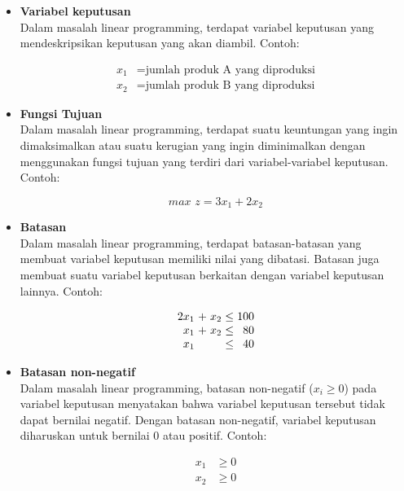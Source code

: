 \begin{itemize}
	\item \textbf{Variabel keputusan}\\
		Dalam masalah linear programming, terdapat variabel keputusan yang mendeskripsikan keputusan yang akan diambil. Contoh:
		
		\begin{equation*}
			\begin{split}
				x_1 &= \text{jumlah produk A yang diproduksi} \\
    			x_2 &= \text{jumlah produk B yang diproduksi}
			\end{split}
		\end{equation*}
		
	\item \textbf{Fungsi Tujuan}\\
		Dalam masalah linear programming, terdapat suatu keuntungan yang ingin dimaksimalkan atau suatu kerugian yang ingin diminimalkan dengan menggunakan  fungsi tujuan yang terdiri dari variabel-variabel keputusan. Contoh:
		
		\begin{equation*}
			\textit{max } z = 3x_1 + 2x_2
		\end{equation*}

	\item \textbf{Batasan}\\
		Dalam masalah linear programming, terdapat batasan-batasan yang membuat variabel keputusan memiliki nilai yang dibatasi. Batasan juga membuat suatu variabel keputusan berkaitan dengan variabel keputusan lainnya. Contoh:
		
		\begin{equation*}		
			\setlength\arraycolsep{1.5pt}
			\begin{array}{r c r c r}
				2x_1 & + & x_2 & \leq & 100 \\
    			x_1 & + & x_2 & \leq & 80 \\
    			x_1 & & & \leq & 40
			\end{array}
		\end{equation*}
		
	\item \textbf{Batasan non-negatif}\\
		Dalam masalah linear programming, batasan non-negatif (\(x_i\geq 0\)) pada variabel keputusan menyatakan bahwa variabel keputusan tersebut tidak dapat bernilai negatif. Dengan batasan non-negatif, variabel keputusan diharuskan untuk bernilai 0 atau positif. Contoh:
		
		\begin{equation*}
			\begin{split}
    			x_1 &\geq 0 \\
    			x_2 &\geq 0
			\end{split}
		\end{equation*}
		
\end{itemize}

